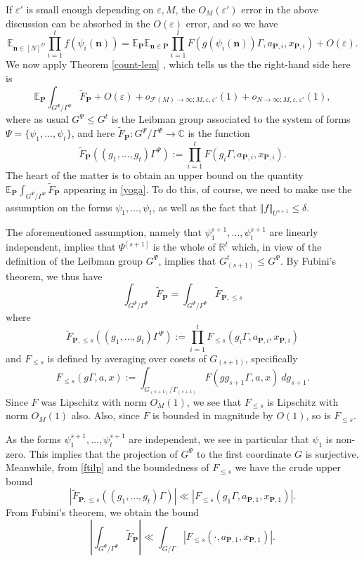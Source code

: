 \documentclass[11pt,reqno]{amsart}
\numberwithin{equation}{section}
\theoremstyle{plain}
\theoremstyle{definition}
\renewcommand{\leq}{\leqslant}
\newcommand\E{{\mathbb{E}}}
\newcommand\R{\mathbb{R}}
\newcommand\C{\mathbb{C}}
\newcommand\1{{\bf 1}}
\newcommand\2{{\bf 2}}
\newcommand\eps{\varepsilon}
\newcommand\Grow{{\mathcal F}}
\begin{document}
If $\eps'$ is small enough depending on $\eps,M$, the $O_M(\eps')$ error in the above discussion can be absorbed in the $O(\eps)$ error, and so we have
$$\E_{\mathbf{n} \in [N]^D} \prod_{i=1}^t f( \psi_i(\mathbf{n}) ) 
 = \E_{{\mathbf{P}}} \E_{\mathbf{n} \in {\mathbf{P}}} \prod_{i=1}^t F( g(\psi_i(\mathbf{n})) \Gamma, a_{{\mathbf{P}},i}, x_{{\mathbf{P}},i} ) + O(\eps).$$
We now apply Theorem \ref{count-lem} , which tells us the the right-hand side here is
\begin{equation}\label{yoga}
\E_{{\mathbf{P}}} \int_{G^{\Psi}/\Gamma^{\Psi} }\tilde F_{{\mathbf{P}}} + O(\eps) + o_{\Grow(M) \to\infty;M,\eps,\eps'}(1)
+ o_{N \to\infty;M,\eps,\eps'}(1),
\end{equation}
where as usual $G^{\Psi} \leq G^t$ is the Leibman group associated to the system of forms $\Psi = \{\psi_1,\dots,\psi_t\}$, and here $\tilde F_{{\mathbf{P}}}: G^{\Psi}/\Gamma^{\Psi} \to \C$ is the function
$$ \tilde F_{{\mathbf{P}}}((g_1,\ldots,g_t)\Gamma^{\Psi}) := \prod_{i=1}^t F(g_i\Gamma, a_{{\mathbf{P}},i}, x_{{\mathbf{P}},i} ).$$
The heart of the matter is to obtain an upper bound on the quantity $\E_{{\mathbf{P}}} \int_{G^{\Psi}/\Gamma^{\Psi} }\tilde F_{{\mathbf{P}}}$ appearing in \eqref{yoga}. To do this, of course, we need to make use the assumption on the forms $\psi_1,\dots,\psi_t$, as well as the fact that $\Vert f \Vert_{U^{s+1}} \leq \delta$.

The aforementioned assumption, namely that $\psi_1^{s+1},\ldots,\psi_t^{s+1}$ are linearly independent, implies that $\Psi^{[s+1]}$ is the whole of $\R^t$ which, in view of the definition of the Leibman group $G^{\Psi}$, implies that $G_{(s+1)}^t \leq G^{\Psi}$.  By Fubini's theorem, we thus have
$$ \int_{G^{\Psi}/\Gamma^{\Psi}} \tilde F_{{\mathbf{P}}} = \int_{G^{\Psi}/\Gamma^{\Psi}} \tilde F_{{\mathbf{P}},\leq s}$$
where
\begin{equation}\label{ftilp}
 \tilde F_{{\mathbf{P}},\leq s}((g_1,\ldots,g_t)\Gamma^{\Psi}) := \prod_{i=1}^t F_{\leq s}(g_i\Gamma, a_{{\mathbf{P}},i}, x_{{\mathbf{P}},i} )
\end{equation}
and $F_{\leq s}$ is defined by averaging over cosets of $G_{(s+1)}$, specifically
$$ F_{\leq s}(g\Gamma,a,x) := \int_{G_{(s+1)}/\Gamma_{(s+1)}} F(g g_{s+1} \Gamma,a,x)\ dg_{s+1}.$$
Since $F$ was Lipschitz with norm $O_M(1)$, we see that $F_{\leq s}$ is Lipschitz with norm $O_M(1)$ also.  Also, since $F$ is bounded in magnitude by $O(1)$, so is $F_{\leq s}$.

As the forms $\psi_1^{s+1},\ldots,\psi_t^{s+1}$ are independent, we see in particular that $\psi_1$ is non-zero.  This implies that the projection of $G^{\Psi}$ to the first coordinate $G$ is surjective.  Meanwhile, from \eqref{ftilp} and the boundedness of $F_{\leq s}$ we have the crude upper bound
$$
|\tilde F_{{\mathbf{P}},\leq s}((g_1,\ldots,g_t)\Gamma)| \ll |F_{\leq s}(g_1\Gamma, a_{{\mathbf{P}},1}, x_{{\mathbf{P}},1} )|.$$
From Fubini's theorem, we obtain the bound
\begin{equation}\label{tfap}
 |\int_{G^{\Psi}/\Gamma^{\Psi}} \tilde F_{{\mathbf{P}}}| \ll \int_{G/\Gamma} |F_{\leq s}(\cdot, a_{{\mathbf{P}},1}, x_{{\mathbf{P}},1} )|.
\end{equation}
\end{document}
